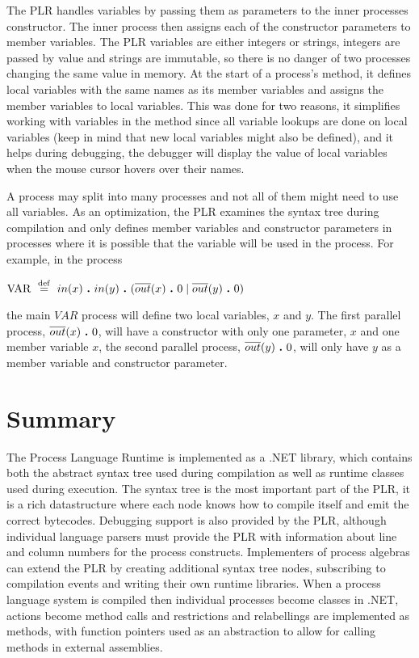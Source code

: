 	The PLR handles variables by passing them as parameters to the inner 
	processes constructor. The inner process then assigns each of the 
	constructor parameters to member variables. The PLR variables are either 
	integers or strings, integers are passed by value and strings are immutable, 
	so there is no danger of two processes changing the same value in memory. At 
	the start of a process's  method, it defines local 
	variables with the same names as its member variables and assigns the member 
	variables to local variables. This was done for two reasons, it simplifies 
	working with variables in the method since all variable lookups are done on 
	local variables (keep in mind that new local variables might also be 
	defined), and it helps during debugging, the debugger will display the value 
	of local variables when the mouse cursor hovers over their names.
	
  A process may split into many processes and not all of them might need to 
  use all variables. As an optimization, the PLR examines the syntax tree 
  during compilation and only defines member variables and constructor 
  parameters in processes where it is possible that the variable will be used 
  in the process. For example, in the process
  
  \begin{center}$\mathrm{VAR} \ \stackrel{\mathrm{def}}{=}\  in(x) \ \textbf{.}\  in(y)\ \textbf{.}\  (\overline{out}(x) \ \textbf{.}\  0 \mid \overline{out}(y) \ \textbf{.}\  0)$\end{center}
  
	the main $VAR$ process will define two local variables, $x$ and $y$. The 
	first parallel process, $\overline{out}(x) \ \textbf{.}\  0$, will have a 
	constructor with only one parameter, $x$ and one member variable $x$, the 
	second parallel process, $\overline{out}(y) \ \textbf{.}\  0$, will only have $y$ 
	as a member variable and constructor parameter.

\section{Summary}

	The Process Language Runtime is implemented as a .NET library, which 
	contains both the abstract syntax tree used during compilation as well as 
	runtime classes used during execution. The syntax tree is the most important 
	part of the PLR, it is a rich datastructure where each node knows how to 
	compile itself and emit the correct bytecodes. Debugging support is also 
	provided by the PLR, although individual language parsers must provide the 
	PLR with information about line and column numbers for the process 
	constructs. Implementers of process algebras can extend the PLR by creating 
	additional syntax tree nodes, subscribing to compilation events and writing 
	their own runtime libraries. When a process language system is compiled then 
	individual processes become classes in .NET, actions become method calls and 
	restrictions and relabellings are implemented as methods, with function 
	pointers used as an abstraction to allow for calling methods in external 
	assemblies.
  